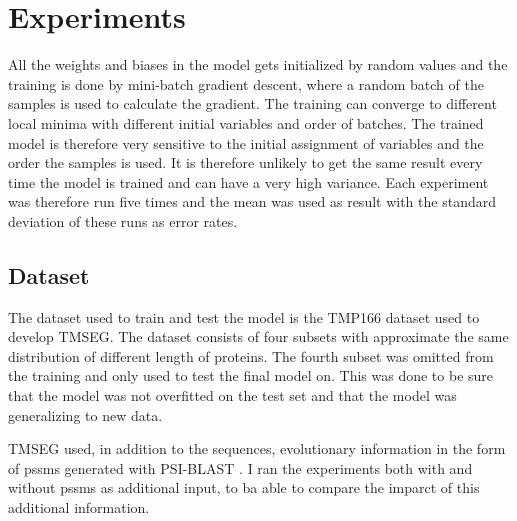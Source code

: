 \section{Experiments}
	

	


All the weights and biases in the model gets initialized by random values and the training
is done by mini-batch gradient descent, where a random batch of the samples is used to 
calculate the gradient. The training can converge to different local minima with 
different initial variables and order of batches.
The trained model is therefore very sensitive to the initial assignment of 
variables and the order the samples is used. It is therefore unlikely to get the same 
result every time the model is trained and can have a very high variance. 
Each experiment was therefore run five times and the mean was used as result with 
the standard deviation of these runs as error rates.


\subsection{Dataset}
The dataset used to train and test the model is the TMP166\cite{tmseg} dataset used to 
develop TMSEG. The dataset consists of four subsets with approximate the same distribution 
of different length of proteins. The fourth subset was omitted from the training and only 
used to test the final model on. This was done to be sure that the model was not overfitted
on the test set and that the model was generalizing to new data. 

TMSEG used, in addition to the sequences, evolutionary information in 
the form of \glspl{pssm} generated with 
PSI-BLAST \cite{psi-blast}. I ran the experiments both with and without \glspl{pssm}
as additional input, to ba able to compare the imparct of this additional information.

